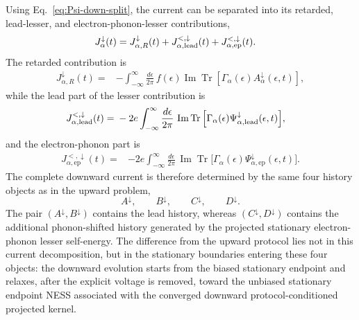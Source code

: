 \documentclass[
 reprint,
 superscriptaddress,
 amsmath,amssymb,
 aps,prb,
 longbibliography,
 floatfix
]{revtex4-2}
\newcommand{\ep}{\mathrm{ep}}
\begin{document}
Using Eq.~\eqref{eq:Psi-down-split}, the current can be separated into its retarded, lead-lesser, and electron-phonon-lesser contributions,
\begin{equation*}
\begin{aligned}
J_\alpha^\downarrow(t)
={}&
J_{\alpha,R}^\downarrow(t)
+
J_{\alpha,\rm lead}^{<,\downarrow}(t)
+
J_{\alpha,\ep}^{<,\downarrow}(t).
\end{aligned}
\end{equation*}
The retarded contribution is
\begin{equation*}
\begin{aligned}
J_{\alpha,R}^\downarrow(t)
={}&
-
\int_{-\infty}^{\infty}
\frac{d\epsilon}{2\pi}\,
f(\epsilon)
\operatorname{Im}
\operatorname{Tr}
\left[
\Gamma_\alpha(\epsilon)
A_\alpha^\downarrow(\epsilon,t)
\right],
\end{aligned}
\end{equation*}
while the lead part of the lesser contribution is
\begin{equation*}
\begin{aligned}
J_{\alpha,\rm lead}^{<,\downarrow}(t)
={}&
-2e
\int_{-\infty}^{\infty}
\frac{d\epsilon}{2\pi}\,
\operatorname{Im}
\operatorname{Tr}
\Big[
\Gamma_\alpha(\epsilon)
\Psi_{\alpha,\rm lead}^\downarrow
(\epsilon,t)
\Big],
\end{aligned}
\end{equation*}
and the electron-phonon part is
\begin{equation*}
\begin{aligned}
J_{\alpha,\ep}^{<,\downarrow}(t)
={}&
-2e
\int_{-\infty}^{\infty}
\frac{d\epsilon}{2\pi}\,
\operatorname{Im}
\operatorname{Tr}
\Big[
\Gamma_\alpha(\epsilon)
\Psi_{\alpha,\ep}^\downarrow
(\epsilon,t)
\Big].
\end{aligned}
\end{equation*}
The complete downward current is therefore determined by the same four history objects as in the upward problem,
\begin{equation*}
A^\downarrow,\qquad
B^\downarrow,\qquad
C^\downarrow,\qquad
D^\downarrow.
\end{equation*}
The pair $(A^\downarrow,B^\downarrow)$ contains the lead history, whereas $(C^\downarrow,D^\downarrow)$ contains the additional phonon-shifted history generated by the projected stationary electron-phonon lesser self-energy. The difference from the upward protocol lies not in this current decomposition, but in the stationary boundaries entering these four objects: the downward evolution starts from the biased stationary endpoint and relaxes, after the explicit voltage is removed, toward the unbiased stationary endpoint NESS associated with the converged downward protocol-conditioned projected kernel.
\end{document}
